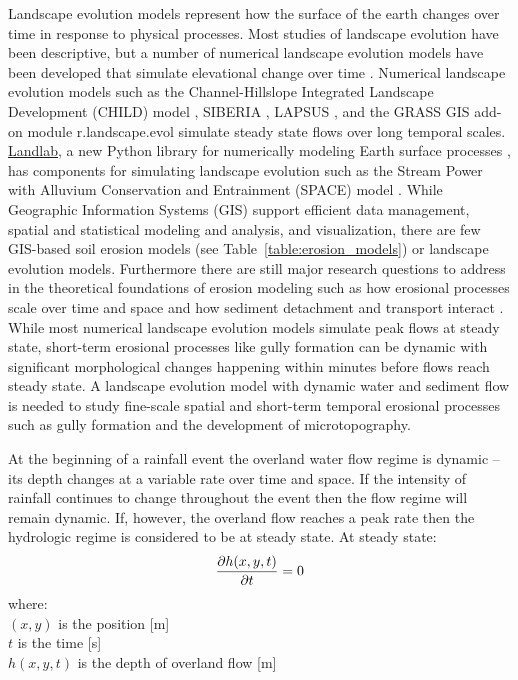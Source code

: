 \documentclass[gmd, manuscript]{copernicus}
\begin{document}
\introduction
Landscape evolution models represent how the surface of the earth changes 
over time in response to physical processes. 
Most studies of landscape evolution have been descriptive, 
but a number of numerical landscape evolution models 
have been developed that simulate elevational change over time 
\citep{Temme2013}. 
Numerical landscape evolution models
such as the Channel-Hillslope Integrated Landscape Development (CHILD) model 
\citep{Tucker2001},
SIBERIA \citep{Willgoose2005},
LAPSUS \citep{Schoorl2000,Schoorl2002},
and the GRASS GIS add-on module r.landscape.evol \citep{Barton2010}
simulate steady state flows over long temporal scales.
\href{http://landlab.github.io/}{Landlab},
a new Python library for numerically modeling Earth surface processes
\citep{Hobley2017},
has components for simulating landscape evolution such as the 
Stream Power with Alluvium Conservation and Entrainment (SPACE) 
model \citep{Shobe2017}.
While Geographic Information Systems (GIS)
support efficient data management, 
spatial and statistical modeling and analysis, 
and visualization,
there are few GIS-based soil erosion models (see Table~\ref{table:erosion_models})
or landscape evolution models.
Furthermore there are still major research questions 
to address in the theoretical foundations of erosion modeling 
such as how erosional processes scale over time and space 
and how sediment detachment and transport interact \citep{Mitasova2013}. 
While most numerical landscape evolution models 
simulate peak flows at steady state,
short-term erosional processes like gully formation can be dynamic
with significant morphological changes happening within minutes
before flows reach steady state. 
A landscape evolution model with dynamic water and sediment flow
is needed to study fine-scale spatial and short-term temporal erosional processes
such as gully formation and the development of microtopography. 

At the beginning of a rainfall event 
the overland water flow regime is dynamic -- 
its depth changes at a variable rate over time and space. 
If the intensity of rainfall continues to change throughout the event
then the flow regime will remain dynamic. 
If, however, the overland flow reaches a peak rate
then the hydrologic regime is considered to be at steady state.
At steady state:
\begin{equation}
\label{eq:steady_state}
{\partial h(x,y,t) \over \partial t} = 0
\end{equation}
%
{\small
\noindent
where: \\
\noindent
\hspace*{0.5em} $(x,y)$ is the position [\unit{m}]\\
\hspace*{0.5em} $t$ is the time [\unit{s}]\\
\hspace*{0.5em} $h(x,y,t)$ is the depth of overland flow [\unit{m}]\\
}
\end{document}
